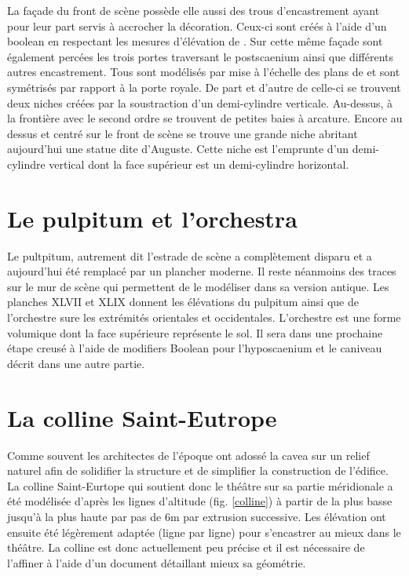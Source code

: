 La façade du front de scène possède elle aussi des trous d'encastrement ayant pour leur part servis à accrocher la décoration. Ceux-ci sont créés à l'aide d'un \gls{boolean} en respectant les mesures d'élévation de \cite[Pl. XXIX]{orangePl}. Sur cette même façade sont également percées les trois portes traversant le \gls{postscaenium} ainsi que différents autres encastrement. Tous sont modélisés par mise à l'échelle des plans de \cite{orangePl} et sont symétrisés par rapport à la porte royale. De part et d'autre de celle-ci se trouvent deux niches créées par la soustraction d'un demi-cylindre verticale. Au-dessus, à la frontière avec le second ordre se trouvent de petites baies à arcature. Encore au dessus et centré sur le front de scène se trouve une grande niche abritant aujourd'hui une statue dite d'Auguste. Cette niche est l'emprunte d'un demi-cylindre vertical dont la face supérieur est un demi-cylindre horizontal.


		\section{Le pulpitum et l'orchestra} 

Le pultpitum, autrement dit l'estrade de scène a complètement disparu et a aujourd'hui été remplacé par un plancher moderne. Il reste néanmoins des traces sur le mur de scène qui permettent de le modéliser dans sa version antique. Les planches XLVII et XLIX \cite{orangePl} donnent les élévations du pulpitum ainsi que de l'orchestre sure les extrémités orientales et occidentales. L'orchestre est une forme volumique dont la face supérieure représente le sol. Il sera dans une prochaine étape creusé à l'aide de modifiers Boolean pour l'hyposcaenium et le caniveau décrit dans une autre partie.

		\section{La colline Saint-Eutrope} 
Comme souvent les architectes de l'époque ont adossé la cavea sur un relief naturel afin de solidifier la structure et de simplifier la construction de l'édifice. La colline Saint-Eurtope qui soutient donc le théâtre sur sa partie méridionale a été modélisée d'après les lignes d'altitude (fig. \ref{colline}) à partir de la plus basse jusqu'à la plus haute par pas de 6m par extrusion successive. Les élévation ont ensuite été légèrement adaptée (ligne par ligne) pour s'encastrer au mieux dans le théâtre. La colline est donc actuellement peu précise et il est nécessaire de l'affiner à l'aide d'un document détaillant mieux sa géométrie.

